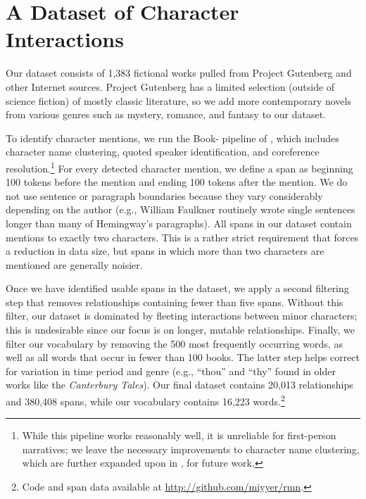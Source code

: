 \section{A Dataset of Character Interactions}
\label{sec:data}

Our dataset consists of 1,383 fictional works pulled from Project
Gutenberg and other Internet sources. Project Gutenberg has a limited
selection (outside of science fiction) of mostly classic literature,
so we add more contemporary novels from various genres such as
mystery, romance, and fantasy to our dataset.

To identify character mentions, we run the Book- pipeline of
, which includes character name
clustering, quoted speaker identification, and coreference
resolution.\footnote{While this pipeline works reasonably well, it is unreliable
  for first-person narratives; we leave the necessary improvements to character
  name clustering, which are further expanded upon in , for
  future work.} For every detected character mention, we define a span as
beginning 100 tokens before the mention and ending 100 tokens after the
mention. We do not use sentence or paragraph boundaries because they vary
considerably depending on the author (e.g., William Faulkner routinely wrote
single sentences longer than many of Hemingway's paragraphs). All spans in our
dataset contain mentions to exactly two characters. This is a rather strict
requirement that forces a reduction in data size, but spans in which more than
two characters are mentioned are generally noisier.

Once we have identified usable spans in the dataset, we apply a second filtering
step that removes relationships containing fewer than five spans. Without this
filter, our dataset is dominated by fleeting interactions between minor
characters; this is undesirable since our focus is on longer, mutable
relationships. Finally, we filter our vocabulary by removing the 500 most
frequently occurring words, as well as all words that occur in fewer than 100
books. The latter step helps correct for variation in time period and genre
(e.g., ``thou'' and ``thy'' found in older works like the \textit{Canterbury
  Tales}). Our final dataset contains 20,013 relationships and 380,408 spans,
while our vocabulary contains 16,223 words.\footnote{Code and span data
  available at \url{http://github.com/miyyer/rmn}.}
